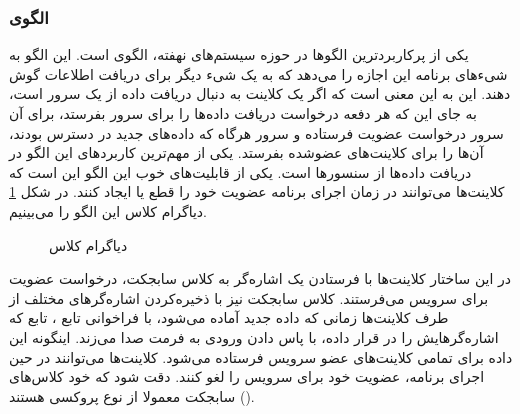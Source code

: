 \subsubsection{الگوی }
\label{HWObserverSec}
\begin{RTL}
یکی از پرکاربردترین الگوها در حوزه سیستم‌های نهفته، الگوی  است.
این الگو به شیء‌های برنامه این اجازه را می‌دهد که به یک شی‌ء دیگر برای دریافت
اطلاعات گوش دهند. این به این معنی است که اگر یک کلاینت به دنبال دریافت
داده از یک سرور است، به جای این که هر دفعه درخواست دریافت داده‌ها را برای
سرور بفرستد، برای آن سرور درخواست عضویت فرستاده و سرور هرگاه که داده‌های جدید
در دسترس بودند، آن‌ها را برای کلاینت‌های عضوشده بفرستد. یکی از مهم‌ترین کاربردهای
این الگو در دریافت داده‌ها از سنسورها است.
یکی از قابلیت‌های خوب این الگو این است که کلاینت‌ها می‌توانند در زمان اجرای برنامه
عضویت خود را قطع یا ایجاد کنند. در شکل \ref{HWObserverClassDiag}
دیاگرام کلاس این الگو را می‌بینیم.
\end{RTL}
\begin{figure}[h!]
\centering
{}
\caption{دیاگرام کلاس }
\label{HWObserverClassDiag}
\end{figure}
\begin{RTL}
در این ساختار کلاینت‌ها با فرستادن یک اشاره‌گر به کلاس سابجکت، درخواست عضویت برای 
سرویس می‌فرستند. کلاس سابجکت نیز با ذخیره‌کردن اشاره‌گرهای مختلف از طرف کلاینت‌ها
زمانی که داده جدید آماده می‌شود، با فراخوانی تابع ، تابع 
که اشاره‌گرهایش را در  قرار داده، با پاس دادن
ورودی به فرمت  صدا می‌زند. اینگونه این داده برای تمامی کلاینت‌های
عضو سرویس فرستاده می‌شود.
کلاینت‌ها می‌توانند در حین اجرای برنامه، عضویت خود برای سرویس را لغو کنند.
دقت شود که خود کلاس‌‌های سابجکت
معمولا از نوع پروکسی هستند ().
\end{RTL}